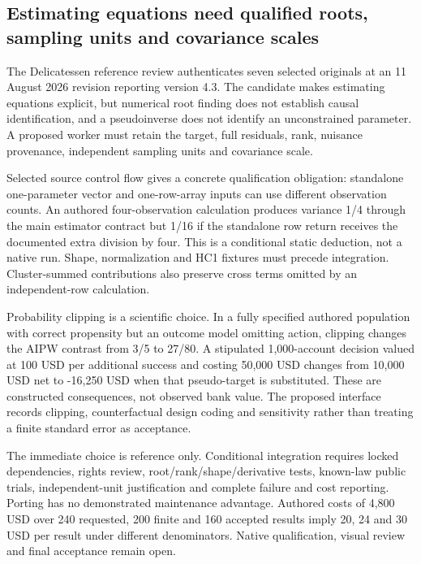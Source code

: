 \hypertarget{estimating-equations-need-qualified-roots-sampling-units-and-covariance-scales}{%
\subsection{Estimating equations need qualified roots, sampling units
and covariance
scales}\label{estimating-equations-need-qualified-roots-sampling-units-and-covariance-scales}}

The Delicatessen reference review authenticates seven selected originals
at an 11 August 2026 revision reporting version 4.3. The candidate makes
estimating equations explicit, but numerical root finding does not
establish causal identification, and a pseudoinverse does not identify
an unconstrained parameter. A proposed worker must retain the target,
full residuals, rank, nuisance provenance, independent sampling units
and covariance scale.
\citep{exec24_delicatessen_source,exec24_delicatessen_choice}

Selected source control flow gives a concrete qualification obligation:
standalone one-parameter vector and one-row-array inputs can use
different observation counts. An authored four-observation calculation
produces variance 1/4 through the main estimator contract but 1/16 if
the standalone row return receives the documented extra division by
four. This is a conditional static deduction, not a native run. Shape,
normalization and HC1 fixtures must precede integration. Cluster-summed
contributions also preserve cross terms omitted by an independent-row
calculation.
\citep{exec24_delicatessen_source,exec24_delicatessen_choice}

Probability clipping is a scientific choice. In a fully specified
authored population with correct propensity but an outcome model
omitting action, clipping changes the AIPW contrast from 3/5 to 27/80. A
stipulated 1,000-account decision valued at 100 USD per additional
success and costing 50,000 USD changes from 10,000 USD net to -16,250
USD when that pseudo-target is substituted. These are constructed
consequences, not observed bank value. The proposed interface records
clipping, counterfactual design coding and sensitivity rather than
treating a finite standard error as acceptance.
\citep{exec24_delicatessen_choice}

The immediate choice is reference only. Conditional integration requires
locked dependencies, rights review, root/rank/shape/derivative tests,
known-law public trials, independent-unit justification and complete
failure and cost reporting. Porting has no demonstrated maintenance
advantage. Authored costs of 4,800 USD over 240 requested, 200 finite
and 160 accepted results imply 20, 24 and 30 USD per result under
different denominators. Native qualification, visual review and final
acceptance remain open.
\citep{exec24_delicatessen_source,exec24_delicatessen_choice}

